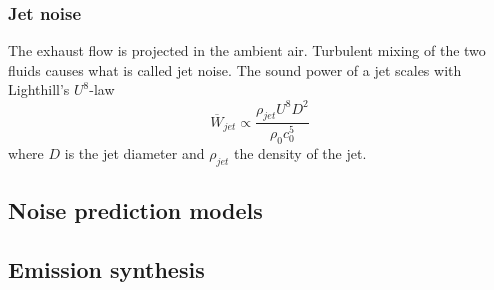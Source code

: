 \subsubsection{Jet noise }
The exhaust flow is projected in the ambient air. Turbulent mixing of the two
fluids causes what is called jet noise. The sound power of a jet scales with Lighthill's $U^8$-law
\begin{equation}
  \overline{W}_{jet} \propto \frac{\rho_{jet} U^8 D^2}{ \rho_0 c_0^5}
\end{equation}
where $D$ is the jet diameter and $\rho_{jet}$ the density of the jet.

\subsection{Noise prediction models}


\subsection{Emission synthesis}


%
%
%
%
%
%
%
%
